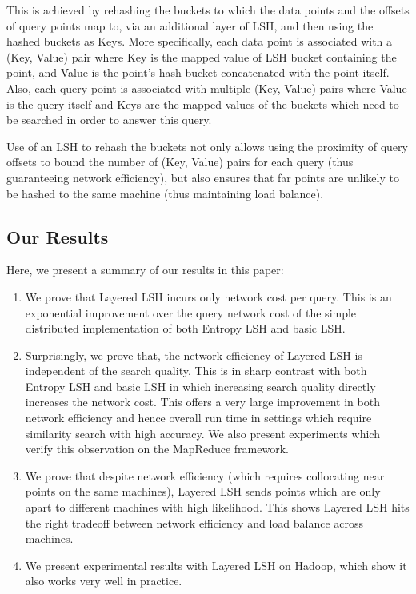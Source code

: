\documentclass{acm_proc_article-sp}
\numberwithin{equation}{section}
\numberwithin{figure}{section}
\begin{document}
This is achieved by rehashing the buckets to which the data points and the offsets of query points map to, via an additional layer of LSH, and then using the hashed buckets as Keys. More specifically, each data point is associated with a (Key, Value) pair where Key is the mapped value of LSH bucket containing the point, and Value is the point's hash bucket concatenated with the point itself. Also, each query point is associated with multiple (Key, Value) pairs where Value is the query itself and Keys are the mapped values of the buckets which need to be searched in order to answer this query. 

Use of an LSH to rehash the buckets not only allows using the proximity of query offsets to bound the number of (Key, Value) pairs for each query (thus guaranteeing network efficiency), but also ensures that far points are unlikely to be hashed to the same machine (thus maintaining load balance).

\subsection{Our Results}
\label{sec:results}

Here, we present a summary of our results in this paper:

\begin{enumerate}
\item We prove that Layered LSH incurs only  network cost per query. This is an exponential improvement over the  query network cost of the simple distributed implementation of both Entropy LSH and basic LSH.  
\item Surprisingly, we prove that, the network efficiency of Layered LSH is independent of the search quality. This is in sharp contrast with both Entropy LSH and basic LSH in which increasing search quality directly increases the network cost. This offers a very large improvement in both network efficiency and hence overall run time in settings which require similarity search with high accuracy. We also present experiments which verify this observation on the MapReduce framework.
\item We prove that despite network efficiency (which requires collocating near points on the same machines), Layered LSH sends points which are only  apart to different machines with high likelihood. This shows Layered LSH hits the right tradeoff between network efficiency and load balance across machines.
\item We present experimental results with Layered LSH on Hadoop, which show it also works very well in practice.

\end{enumerate}
\end{document}
